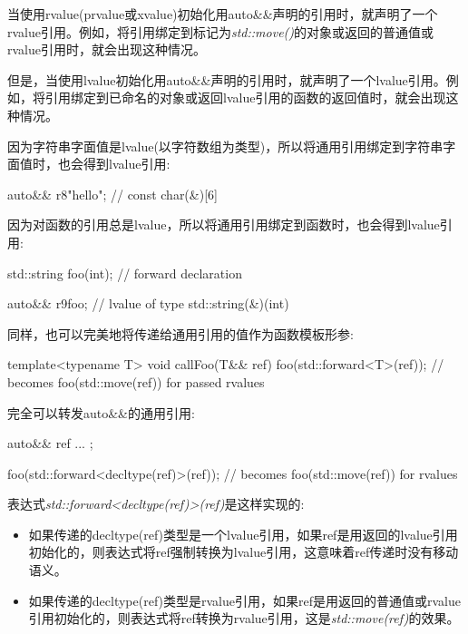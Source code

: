 当使用rvalue(prvalue或xvalue)初始化用auto\&\&声明的引用时，就声明了一个rvalue引用。例如，将引用绑定到标记为\textit{std::move()}的对象或返回的普通值或rvalue引用时，就会出现这种情况。\par

但是，当使用lvalue初始化用auto\&\&声明的引用时，就声明了一个lvalue引用。例如，将引用绑定到已命名的对象或返回lvalue引用的函数的返回值时，就会出现这种情况。\par

因为字符串字面值是lvalue(以字符数组为类型)，所以将通用引用绑定到字符串字面值时，也会得到lvalue引用:\par

\begin{codebox}[cpp]
auto&& r8{"hello"}; // const char(&)[6]
\end{codebox}

因为对函数的引用总是lvalue，所以将通用引用绑定到函数时，也会得到lvalue引用:\par

\begin{codebox}[cpp]
std::string foo(int); // forward declaration

auto&& r9{foo}; // lvalue of type std::string(&)(int)
\end{codebox}


同样，也可以完美地将传递给通用引用的值作为函数模板形参:\par

\begin{codebox}[cpp]
template<typename T>
void callFoo(T&& ref) {
  foo(std::forward<T>(ref)); // becomes foo(std::move(ref)) for passed rvalues
}
\end{codebox}

完全可以转发auto\&\&的通用引用:\par

\begin{codebox}[cpp]
auto&& ref{ ... };

foo(std::forward<decltype(ref)>(ref)); // becomes foo(std::move(ref)) for rvalues
\end{codebox}

表达式\textit{std::\allowbreak{}forward<\allowbreak{}decltype(\allowbreak{}ref)\allowbreak{}>(\allowbreak{}ref)\allowbreak{}}是这样实现的:\par

\begin{itemize}
  \item 如果传递的decltype(ref)类型是一个lvalue引用，如果ref是用返回的lvalue引用初始化的，则表达式将ref强制转换为lvalue引用，这意味着ref传递时没有移动语义。
  \item 如果传递的decltype(ref)类型是rvalue引用，如果ref是用返回的普通值或rvalue引用初始化的，则表达式将ref转换为rvalue引用，这是\textit{std::\allowbreak{}move(\allowbreak{}ref)\allowbreak{}}的效果。
\end{itemize}


